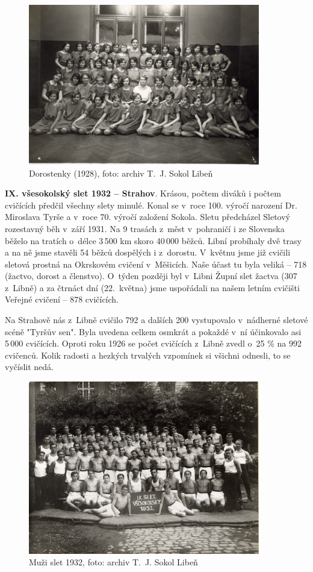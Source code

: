 \documentclass[a5paper, 11pt, twoside]{article}
\begin{document}
\begin{figure}[h!]
  \centering 
  \includegraphics[width=0.9\textwidth]{img/28_dorostenky.jpg}
  \caption*{Dorostenky (1928), foto: archiv T.~J. Sokol Libeň}
\end{figure}

\textbf{IX. všesokolský slet 1932 -- Strahov}. Krásou, počtem diváků i počtem cvičících předčil všechny slety minulé.
Konal se v~roce 100. výročí narození Dr. Miroslava Tyrše a v~roce 70.
výročí založení Sokola. Sletu předcházel Sletový rozestavný běh v~září
1931. Na 9 trasách z~měst v~pohraničí i ze Slovenska běželo na tratích
o~délce 3\,500 km skoro 40\,000 běžců. Libní probíhaly dvě trasy a na ně
jsme stavěli 54 běžců dospělých i z~dorostu. V~květnu jsme již cvičili
sletová prostná na Okrskovém cvičení v~Měšicích. Naše účast tu byla
veliká -- 718 (žactvo, dorost a členstvo). O~týden později byl v~Libni
Župní slet žactva (307 z~Libně) a za čtrnáct dní (22.~května) jsme
uspořádali na našem letním cvičišti Veřejné cvičení -- 878 cvičících.

Na Strahově nás z~Libně cvičilo 792 a dalších 200 vystupovalo v~nádherné
sletové scéně "Tyršův sen". Byla uvedena celkem osmkrát a pokaždé v~ní
účinkovalo asi 5\,000 cvičících. Oproti roku 1926 se počet cvičících
z~Libně zvedl o~25 \% na 992 cvičenců. Kolik radosti a hezkých trvalých
vzpomínek si všichni odnesli, to se vyčíslit nedá.

\begin{figure}[h!]
  \centering 
  \includegraphics[width=0.9\textwidth]{img/29_muzi_slet.jpg}
  \caption*{Muži slet 1932, foto: archiv T.~J. Sokol Libeň}
\end{figure}
\end{document}
